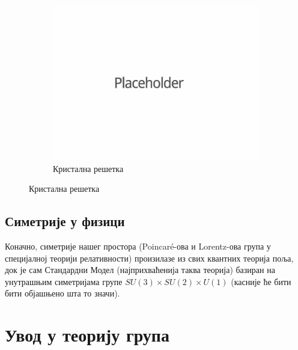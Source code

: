 \documentclass{report}
\theoremstyle{plain}
\theoremstyle{definition}
\begin{document}
\begin{figure}[h]
\begin{subfigure}{0.3\textwidth}
\includegraphics[width=\textwidth]{placeholder}
\caption{Кристална решетка}
\end{subfigure}
\end{figure}

\section{Симетрије у физици}
Коначно, симетрије нашег простора (Poincaré-ова и Lorentz-ова група у специјалној теорији релативности) произилазе из свих квантних теорија поља, док је сам Стандардни Модел (најприхваћенија таква теорија) базиран на унутрашњим симетријама групе $SU(3)\times SU(2)\times U(1)$ (касније ће бити бити објашњено шта то значи).

\chapter{Увод у теорију група}
\end{document}
